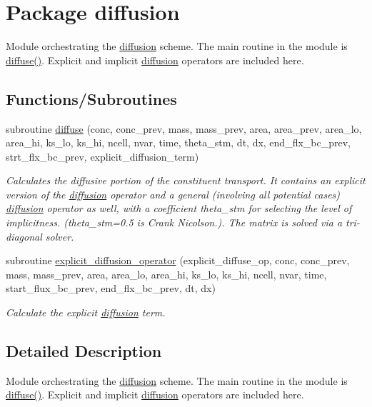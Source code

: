 \hypertarget{a00027}{
\section{Package diffusion}
\label{a00027}
}
Module orchestrating the \hyperlink{a00027}{diffusion} scheme. The main routine in the module is \hyperlink{a00027_1d88a1781a952a596470deaf3506b476}{diffuse()}. Explicit and implicit \hyperlink{a00027}{diffusion} operators are included here.  


\subsection*{Functions/Subroutines}
\begin{CompactItemize}
\item 
subroutine \hyperlink{a00027_1d88a1781a952a596470deaf3506b476}{diffuse} (conc, conc\_\-prev, mass, mass\_\-prev, area, area\_\-prev, area\_\-lo, area\_\-hi, ks\_\-lo, ks\_\-hi, ncell, nvar, time, theta\_\-stm, dt, dx, end\_\-flx\_\-bc\_\-prev, strt\_\-flx\_\-bc\_\-prev, explicit\_\-diffusion\_\-term)
\begin{CompactList}\small\item\em Calculates the diffusive portion of the constituent transport. It contains an explicit version of the \hyperlink{a00027}{diffusion} operator and a general (involving all potential cases) \hyperlink{a00027}{diffusion} operator as well, with a coefficient theta\_\-stm for selecting the level of implicitness. (theta\_\-stm=0.5 is Crank Nicolson.). The matrix is solved via a tri-diagonal solver. \item\end{CompactList}\item 
subroutine \hyperlink{a00027_9da6bb8848c4bfaf6b6a8f4cb4d4dd9c}{explicit\_\-diffusion\_\-operator} (explicit\_\-diffuse\_\-op, conc, conc\_\-prev, mass, mass\_\-prev, area, area\_\-lo, area\_\-hi, ks\_\-lo, ks\_\-hi, ncell, nvar, time, start\_\-flux\_\-bc\_\-prev, end\_\-flx\_\-bc\_\-prev, dt, dx)
\begin{CompactList}\small\item\em Calculate the explicit \hyperlink{a00027}{diffusion} term. \item\end{CompactList}\end{CompactItemize}


\subsection{Detailed Description}
Module orchestrating the \hyperlink{a00027}{diffusion} scheme. The main routine in the module is \hyperlink{a00027_1d88a1781a952a596470deaf3506b476}{diffuse()}. Explicit and implicit \hyperlink{a00027}{diffusion} operators are included here. 



